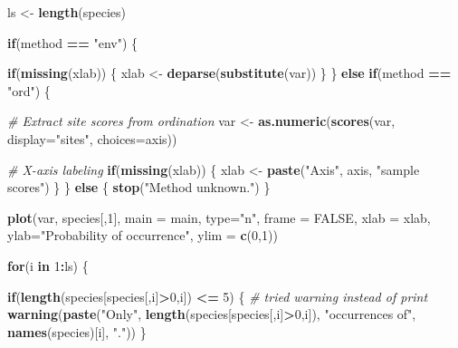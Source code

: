 \documentclass[]{article}
\newenvironment{Shaded}{\begin{snugshade}}{\end{snugshade}}
\newcommand{\CommentTok}[1]{\textcolor[rgb]{0.56,0.35,0.01}{\textit{#1}}}
\newcommand{\ControlFlowTok}[1]{\textcolor[rgb]{0.13,0.29,0.53}{\textbf{#1}}}
\newcommand{\DataTypeTok}[1]{\textcolor[rgb]{0.13,0.29,0.53}{#1}}
\newcommand{\DecValTok}[1]{\textcolor[rgb]{0.00,0.00,0.81}{#1}}
\newcommand{\KeywordTok}[1]{\textcolor[rgb]{0.13,0.29,0.53}{\textbf{#1}}}
\newcommand{\NormalTok}[1]{#1}
\newcommand{\OperatorTok}[1]{\textcolor[rgb]{0.81,0.36,0.00}{\textbf{#1}}}
\newcommand{\OtherTok}[1]{\textcolor[rgb]{0.56,0.35,0.01}{#1}}
\newcommand{\StringTok}[1]{\textcolor[rgb]{0.31,0.60,0.02}{#1}}
\begin{document}
\begin{Shaded}
\begin{Highlighting}[]
\NormalTok{    ls <-}\StringTok{ }\KeywordTok{length}\NormalTok{(species)}
    
    \ControlFlowTok{if}\NormalTok{(method }\OperatorTok{==}\StringTok{ "env"}\NormalTok{) \{}
      
      \ControlFlowTok{if}\NormalTok{(}\KeywordTok{missing}\NormalTok{(xlab)) \{}
\NormalTok{        xlab <-}\StringTok{ }\KeywordTok{deparse}\NormalTok{(}\KeywordTok{substitute}\NormalTok{(var))}
\NormalTok{      \}}
\NormalTok{    \} }\ControlFlowTok{else} \ControlFlowTok{if}\NormalTok{(method }\OperatorTok{==}\StringTok{ "ord"}\NormalTok{) \{}
      
      \CommentTok{# Extract site scores from ordination}
\NormalTok{      var <-}\StringTok{ }\KeywordTok{as.numeric}\NormalTok{(}\KeywordTok{scores}\NormalTok{(var, }\DataTypeTok{display=}\StringTok{"sites"}\NormalTok{, }\DataTypeTok{choices=}\NormalTok{axis))}
      
      \CommentTok{# X-axis labeling}
      \ControlFlowTok{if}\NormalTok{(}\KeywordTok{missing}\NormalTok{(xlab)) \{}
\NormalTok{        xlab <-}\StringTok{ }\KeywordTok{paste}\NormalTok{(}\StringTok{"Axis"}\NormalTok{, axis, }\StringTok{"sample scores"}\NormalTok{)}
\NormalTok{      \}}
\NormalTok{    \} }\ControlFlowTok{else}\NormalTok{ \{}
      \KeywordTok{stop}\NormalTok{(}\StringTok{"Method unknown."}\NormalTok{)}
\NormalTok{    \}}
    
    \KeywordTok{plot}\NormalTok{(var, species[,}\DecValTok{1}\NormalTok{], }\DataTypeTok{main =}\NormalTok{ main, }\DataTypeTok{type=}\StringTok{"n"}\NormalTok{, }\DataTypeTok{frame =} \OtherTok{FALSE}\NormalTok{, }
         \DataTypeTok{xlab =}\NormalTok{ xlab, }\DataTypeTok{ylab=}\StringTok{"Probability of occurrence"}\NormalTok{, }\DataTypeTok{ylim =} \KeywordTok{c}\NormalTok{(}\DecValTok{0}\NormalTok{,}\DecValTok{1}\NormalTok{))}
    
    \ControlFlowTok{for}\NormalTok{(i }\ControlFlowTok{in} \DecValTok{1}\OperatorTok{:}\NormalTok{ls) \{}
      
      \ControlFlowTok{if}\NormalTok{(}\KeywordTok{length}\NormalTok{(species[species[,i]}\OperatorTok{>}\DecValTok{0}\NormalTok{,i]) }\OperatorTok{<=}\StringTok{ }\DecValTok{5}\NormalTok{) \{}
        \CommentTok{# tried warning instead of print}
        \KeywordTok{warning}\NormalTok{(}\KeywordTok{paste}\NormalTok{(}\StringTok{"Only"}\NormalTok{, }\KeywordTok{length}\NormalTok{(species[species[,i]}\OperatorTok{>}\DecValTok{0}\NormalTok{,i]), }\StringTok{"occurrences of"}\NormalTok{, }\KeywordTok{names}\NormalTok{(species)[i], }\StringTok{"."}\NormalTok{))}
\NormalTok{      \}}
      

\end{Highlighting}
\end{Shaded}
\end{document}
